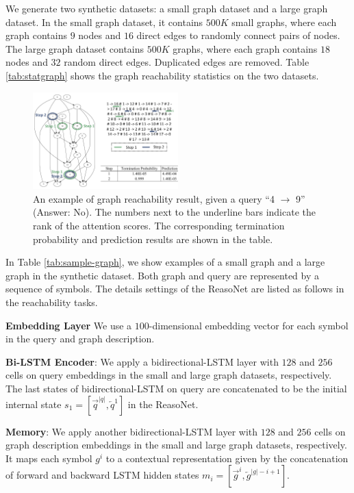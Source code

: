 \documentclass[sigconf]{acmart}
\begin{document}
We generate two synthetic datasets: a small graph dataset and a large graph dataset. In the small graph dataset, it contains $500 K$ small graphs, where each graph contains $9$ nodes and $16$ direct edges to randomly connect pairs of nodes. The large graph dataset contains $500 K$ graphs, where each graph contains $18$ nodes and $32$ random direct edges. Duplicated edges are removed. Table \ref{tab:statgraph} shows the graph reachability statistics on the two datasets. %

\begin{figure}[t!]
	\centering
	\includegraphics[width=0.5\textwidth]{figure/graph_visualization_fail_w_table}
	\caption{{An example of graph reachability result, given a query ``4 $\rightarrow$ 9'' (Answer: No).  The numbers next to the underline bars indicate the rank of the attention scores. The corresponding termination probability and prediction results are shown in the table.}}
	\label{fig:graph_visalization_fail}
\end{figure}

In Table \ref{tab:sample-graph}, we show examples of a small graph and a large graph in the synthetic dataset. Both graph and query are represented by a sequence of symbols. The details settings of the ReasoNet are listed as follows in the reachability tasks.

\textbf{Embedding Layer} We use a $100$-dimensional embedding vector for each symbol in the query and graph description.

\textbf{Bi-LSTM Encoder}: We apply a bidirectional-LSTM layer with $128$ and $256$ cells on query embeddings in the small and large graph datasets, respectively. The last states of bidirectional-LSTM on query are concatenated to be the initial internal state $s_1 = [ \overrightarrow{q}^{|q|}, \overleftarrow{q}^1]$ in the ReasoNet.

\textbf{Memory}: We apply another bidirectional-LSTM layer with $128$ and $256$ cells on graph description embeddings in the small and large graph datasets, respectively. It maps each symbol $g^i$ to a contextual representation given by the concatenation of forward and backward LSTM hidden states $m_i = [\overrightarrow{g}^{i}, \overleftarrow{g}^{|g|-i + 1}]$.
\end{document}
